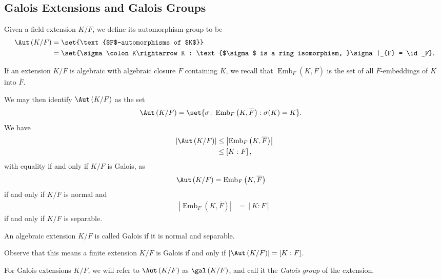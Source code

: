 \documentclass[10pt]{mypackage}
\begin{document}
\subsection{Galois Extensions and Galois Groups}%
\begin{definition}
  Given a field extension $K/F$, we define its automorphism group to be
  \begin{align*}
    \Aut\left( K/F \right) &= \set{\text{$F$-automorphisms of $K$}}\\
                           &= \set{\sigma\colon K\rightarrow K : \text{$\sigma$ is a ring isomorphism, }\sigma|_{F} = \id_F}.
  \end{align*}
\end{definition}
If an extension $K/F$ is algebraic with algebraic closure $ \overline{F} $ containing $K$, we recall that $ \operatorname{Emb}_F\left( K, \overline{F} \right) $ is the set of all $F$-embeddings of $K$ into $ \overline{F} $.

We may then identify $\Aut\left( K/F \right)$ as the set
\begin{align*}
  \Aut\left( K/F \right) &= \set{\sigma\colon \operatorname{Emb}_F\left( K, \overline{F} \right) : \sigma(K) = K}.
\end{align*}
We have
\begin{align*}
  \left\vert \Aut\left( K/F \right) \right\vert &\leq \left\vert \operatorname{Emb}_F\left( K, \overline{F} \right) \right\vert\\
                                                &\leq \left[ K:F \right],
\end{align*}
with equality if and only if $K/F$ is Galois, as
\begin{align*}
  \Aut\left( K/F \right) &= \operatorname{Emb}_F\left( K, \overline{F} \right)
\end{align*}
if and only if $K/F$ is normal and
\begin{align*}
  \left\vert \operatorname{Emb}_F\left( K, \overline{F} \right) \right\vert &= \left[ K:F \right]
\end{align*}
if and only if $K/F$ is separable.
\begin{definition}
  An algebraic extension $K/F$ is called Galois if it is normal and separable.
\end{definition}
Observe that this means a finite extension $K/F$ is Galois if and only if $\left\vert \Aut\left( K/F \right) \right\vert = \left[ K:F \right]$.

For Galois extensions $K/F$, we will refer to $\Aut\left( K/F \right)$ as $\gal\left( K/F \right)$, and call it the \textit{Galois group} of the extension.
\end{document}
